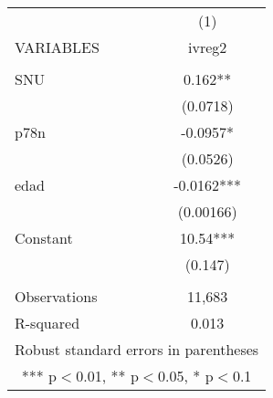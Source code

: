 \begin{tabular}{lc} \hline
 & (1) \\
VARIABLES & ivreg2 \\ \hline
 &  \\
SNU & 0.162** \\
 & (0.0718) \\
p78n & -0.0957* \\
 & (0.0526) \\
edad & -0.0162*** \\
 & (0.00166) \\
Constant & 10.54*** \\
 & (0.147) \\
 &  \\
Observations & 11,683 \\
 R-squared & 0.013 \\ \hline
\multicolumn{2}{c}{ Robust standard errors in parentheses} \\
\multicolumn{2}{c}{ *** p$<$0.01, ** p$<$0.05, * p$<$0.1} \\
\end{tabular}
